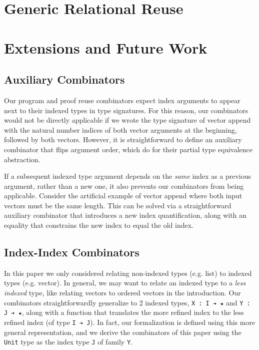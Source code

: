 \documentclass[acmsmall]{acmart}\settopmatter{}
\newcommand{\labsec}[1]{\label{sec:#1}}
\begin{document}
\section{Generic Relational Reuse}
\labsec{rel}


\section{Extensions and Future Work}
\labsec{future}

\subsection{Auxiliary Combinators}

Our program and proof reuse combinators expect index arguments to
appear next to their indexed types in type signatures. For this
reason, our combinators would not be directly applicable if we wrote
the type signature of vector append with the natural number indices of
both vector arguments at the beginning, followed by both
vectors. However, it is straightforward to define an auxiliary combinator that
flips argument order, which \citet{dagand:interop} do for their
partial type equivalence abstraction.

If a subsequent indexed type argument depends on the \textit{same}
index as a previous argument, rather than a new one, it also prevents
our combinators from being applicable. Consider the
artificial example of vector append where both input vectors must be
the same length. This can be solved via a
straightforward auxiliary combinator that introduces a new index quantification,
along with an equality that constrains the new index to equal the old index.

\subsection{Index-Index Combinators}

In this paper we only considered relating non-indexed types (e.g. list)
to indexed types (e.g. vector). In general, we may want to relate
an indexed type to a \textit{less indexed} type, like relating vectors
to ordered vectors in the introduction. Our combinators
straightforwardly generalize to 2 indexed types, \verb;X : I ➔ ★; and
\verb;Y : J ➔ ★;, along with a function that translates
the more refined index to the less refined index
(of type \verb;I ➔ J;). In fact, our formalization is defined using this
more general representation, and we derive the combinators of this
paper using the \verb;Unit; type as the index type \verb;J; of family \verb;Y;.
\end{document}
